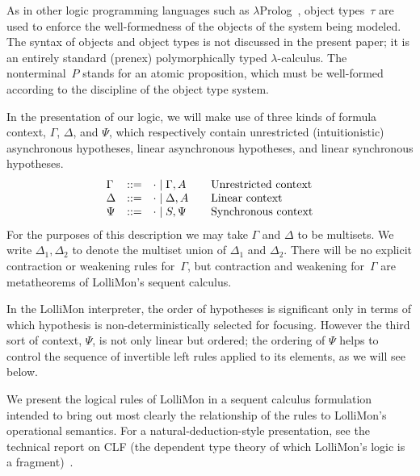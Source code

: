 \documentclass{sig-alt}
\begin{document}
As in other logic programming languages such as
$\lambda$Prolog~\cite{Miller86iclp}, object types~$\tau$ are used to
enforce the well-formedness of the objects of the system being
modeled.
The syntax of objects and object types is not discussed in the present
paper; it is an entirely standard (prenex) polymorphically typed
$\lambda$-calculus.  The nonterminal~$P$ stands for an atomic proposition,
which must be well-formed according to the discipline of the object type system.

In the presentation of our logic, we will make use of three kinds of
formula context, $\Gamma$, $\Delta$, and $\Psi$, which respectively contain unrestricted
(intuitionistic) asynchronous hypotheses, linear asynchronous
hypotheses, and linear synchronous hypotheses.
$$
\begin{array}{lll@{\qquad}l}
  \Gamma & ::= & \cdot \mid \Gamma, A & \mbox{Unrestricted context}\\
  \Delta & ::= & \cdot \mid \Delta, A & \mbox{Linear context}\\
  \Psi   & ::= & \cdot \mid S, \Psi & \mbox{Synchronous context}\\
\end{array}
$$
For the purposes of this description we may take $\Gamma$ and
$\Delta$ to be multisets. We write $\Delta_1,\Delta_2$ to
denote the multiset union of $\Delta_1$ and $\Delta_2$.
There will be no explicit contraction or weakening rules for~$\Gamma$,
but contraction and weakening for~$\Gamma$ are metatheorems of LolliMon's
sequent calculus.

In the
LolliMon interpreter, the order of hypotheses is significant only in
terms of which hypothesis is non-deterministically selected for
focusing.  However the third sort of context, $\Psi$, is not only linear but
ordered; the ordering of $\Psi$ helps to control the sequence of
invertible left rules applied to its elements, as we will see below.

\def\CLFRIseq#1#2#3{#1;#2\Rightarrow#3}
\def\CLFLFseq#1#2#3#4{#1;#2;#3\mathrel{>\!\! >}#4}
\def\CLFLseq#1#2#3{#1;#2\rightarrow#3}
\def\CLFLLFseq#1#2#3#4{#1;#2;#3\mathrel>#4}
\def\CLFLIseq#1#2#3#4{#1;#2;#3\rightarrow#4}
\def\CLFRFseq#1#2#3{#1;#2\mathrel{>\!\! >}#3}

We present the logical rules of LolliMon in a sequent calculus
formulation intended to bring out most clearly the relationship of the
rules to LolliMon's operational semantics.  For a
natural-deduction-style presentation, see the technical report on
CLF (the dependent type theory of which LolliMon's
logic is a fragment)~\cite{Watkins02tr}.  
\end{document}
